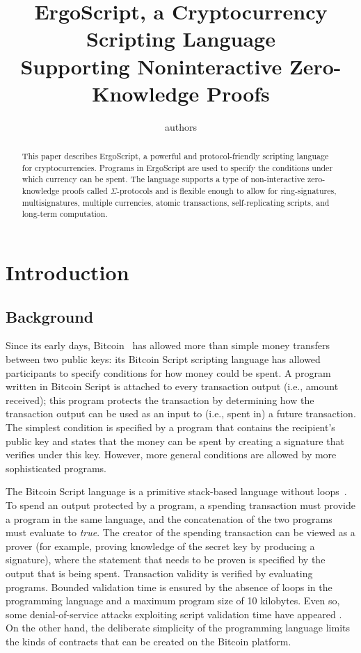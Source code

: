 \documentclass[11pt]{article}
\newcommand{\authnote}[2]{\marginpar{\parbox{\marginparwidth}{\tiny %
  \textsf{#1 {\textcolor{blue}{notes: #2}}}}}%
  \textcolor{blue}{\textbf{\dag}}}
\newcommand{\authnote}[2]{
  \textsf{#1 \textcolor{blue}{: #2}}}
\newcommand{\authnote}[2]{}
\newcommand{\lnote}[1]{{\authnote{\textcolor{orange}{Leo notes}}{#1}}}
\newcommand{\langname}{ErgoScript\xspace}
\begin{document}
\title{\langname, a Cryptocurrency Scripting Language\\Supporting Noninteractive Zero-Knowledge Proofs}

\author{authors}


\maketitle


\begin{abstract}
This paper describes \langname, a powerful and protocol-friendly scripting language for cryptocurrencies. Programs in \langname are used to specify the conditions under which currency can be spent. The language supports a type of non-interactive zero-knowledge proofs called $\Sigma$-protocols and is flexible enough to allow for ring-signatures, multisignatures, multiple currencies, atomic transactions, self-replicating scripts, and long-term computation. \lnote{this list of features could use some improvement}
\end{abstract}



\section{Introduction}
\subsection{Background}

Since its early days, Bitcoin~\cite{Nak08} has allowed more than simple money transfers between two public keys: its Bitcoin Script scripting language has allowed participants to specify conditions for how money could be spent. A program written in Bitcoin Script is attached to every transaction output (i.e., amount received); this program protects the transaction by determining how the transaction output can be used as an input to (i.e., spent in) a future transaction. The simplest condition is specified by a program that contains the recipient's public key and states that the money can be spent by creating a signature that verifies under this key.  However, more general conditions are allowed by more sophisticated programs. 

The Bitcoin Script language is a primitive stack-based language without loops~\cite{bscript}. To spend an output protected by a program, a spending transaction must provide a program in the same language, and the concatenation of the two programs must evaluate to \emph{true}. The creator of the spending transaction can be viewed as a prover (for example, proving knowledge of the secret key by producing a signature), where the statement that needs to be proven is specified by the output that is being spent. Transaction validity is verified by evaluating programs. Bounded validation time is ensured by the absence of loops in the programming language and a maximum program size of 10 kilobytes. Even so, some denial-of-service attacks exploiting script validation time have appeared \cite{bitcoindos, fivehrs, ethattacks}. On the other hand, the deliberate simplicity of the programming language limits the kinds of contracts that can be created on the Bitcoin platform.
\end{document}
